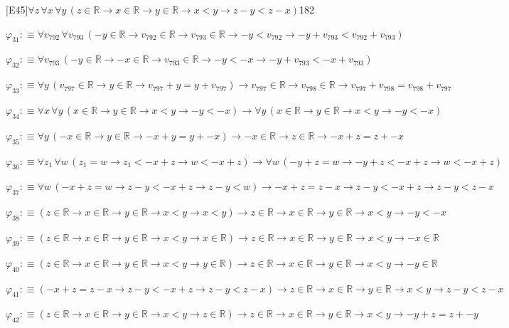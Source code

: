 \begin{fullproof}{[E45]}{$\forall z\,\forall x\,\forall y\,(z \in \mathbb{R} \to x \in \mathbb{R} \to y \in \mathbb{R} \to x < y \to z - y < z - x)$}{182}
\begin{abbrevlist}
\item $\varphi_{31} :\equiv \forall v_{792}\,\forall v_{793}\,(-y \in \mathbb{R} \to v_{792} \in \mathbb{R} \to v_{793} \in \mathbb{R} \to -y < v_{792} \to -y + v_{793} < v_{792} + v_{793})$
\item $\varphi_{32} :\equiv \forall v_{793}\,(-y \in \mathbb{R} \to -x \in \mathbb{R} \to v_{793} \in \mathbb{R} \to -y < -x \to -y + v_{793} < -x + v_{793})$
\item $\varphi_{33} :\equiv \forall y\,(v_{797} \in \mathbb{R} \to y \in \mathbb{R} \to v_{797} + y = y + v_{797}) \to v_{797} \in \mathbb{R} \to v_{798} \in \mathbb{R} \to v_{797} + v_{798} = v_{798} + v_{797}$
\item $\varphi_{34} :\equiv \forall x\,\forall y\,(x \in \mathbb{R} \to y \in \mathbb{R} \to x < y \to -y < -x) \to \forall y\,(x \in \mathbb{R} \to y \in \mathbb{R} \to x < y \to -y < -x)$
\item $\varphi_{35} :\equiv \forall y\,(-x \in \mathbb{R} \to y \in \mathbb{R} \to -x + y = y + -x) \to -x \in \mathbb{R} \to z \in \mathbb{R} \to -x + z = z + -x$
\item $\varphi_{36} :\equiv \forall z_{1}\,\forall w\,(z_{1} = w \to z_{1} < -x + z \to w < -x + z) \to \forall w\,(-y + z = w \to -y + z < -x + z \to w < -x + z)$
\item $\varphi_{37} :\equiv \forall w\,(-x + z = w \to z - y < -x + z \to z - y < w) \to -x + z = z - x \to z - y < -x + z \to z - y < z - x$
\item $\varphi_{38} :\equiv (z \in \mathbb{R} \to x \in \mathbb{R} \to y \in \mathbb{R} \to x < y \to x < y) \to z \in \mathbb{R} \to x \in \mathbb{R} \to y \in \mathbb{R} \to x < y \to -y < -x$
\item $\varphi_{39} :\equiv (z \in \mathbb{R} \to x \in \mathbb{R} \to y \in \mathbb{R} \to x < y \to x \in \mathbb{R}) \to z \in \mathbb{R} \to x \in \mathbb{R} \to y \in \mathbb{R} \to x < y \to -x \in \mathbb{R}$
\item $\varphi_{40} :\equiv (z \in \mathbb{R} \to x \in \mathbb{R} \to y \in \mathbb{R} \to x < y \to y \in \mathbb{R}) \to z \in \mathbb{R} \to x \in \mathbb{R} \to y \in \mathbb{R} \to x < y \to -y \in \mathbb{R}$
\item $\varphi_{41} :\equiv (-x + z = z - x \to z - y < -x + z \to z - y < z - x) \to z \in \mathbb{R} \to x \in \mathbb{R} \to y \in \mathbb{R} \to x < y \to z - y < z - x$
\item $\varphi_{42} :\equiv (z \in \mathbb{R} \to x \in \mathbb{R} \to y \in \mathbb{R} \to x < y \to z \in \mathbb{R}) \to z \in \mathbb{R} \to x \in \mathbb{R} \to y \in \mathbb{R} \to x < y \to -y + z = z + -y$

\end{abbrevlist}
\end{fullproof}
